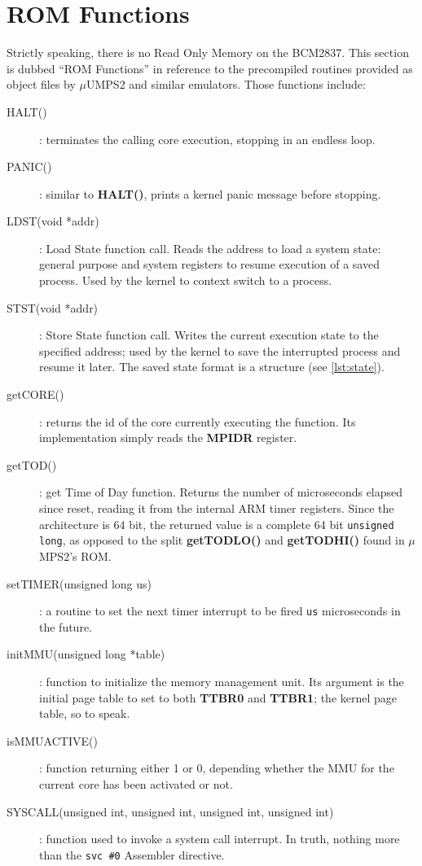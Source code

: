 \documentclass[12pt,a4paper,openright,twoside]{report}
\begin{document}
\section{ROM Functions}
Strictly speaking, there is no Read Only Memory on the BCM2837. This section is 
dubbed ``ROM Functions'' in reference to the precompiled routines provided as 
object files by $\mu$UMPS2 and similar emulators.
Those functions include:
\begin{description}
    \item[HALT()]: terminates the calling core execution, stopping in an endless loop.
    \item[PANIC()]: similar to \textbf{HALT()}, prints a kernel panic message before
        stopping.
    \item[LDST(void *addr)]: Load State function call. Reads the address to load
        a system state: general purpose and system registers to resume execution
        of a saved process. Used by the kernel to context switch to a process.
    \item[STST(void *addr)]: Store State function call. Writes the current execution
        state to the specified address; used by the kernel to save the interrupted
        process and resume it later. The saved state format is a structure (see
         \ref{lst:state}).
    \item[getCORE()]: returns the id of the core currently executing the function.
        Its implementation simply reads the \textbf{MPIDR} register.
    \item[getTOD()]: get Time of Day function. Returns the number of microseconds
        elapsed since reset, reading it from the internal ARM
        timer registers. Since the architecture is 64 bit, the returned value 
        is a complete 64 bit {\tt unsigned long}, as opposed to the split 
        \textbf{getTODLO()} and \textbf{getTODHI()} found in $\mu$MPS2's ROM.
    \item[setTIMER(unsigned long us)]: a routine to set the next timer interrupt to 
        be fired {\tt us} microseconds in the future.
    \item[initMMU(unsigned long *table)]: function to initialize the memory 
        management unit. Its argument is the initial page table to set to both
        \textbf{TTBR0} and \textbf{TTBR1}; the kernel page table, so to speak.
    \item[isMMUACTIVE()]: function returning either 1 or 0, depending whether
        the MMU for the current core has been activated or not.
    \item[SYSCALL(unsigned int, unsigned int, unsigned int, unsigned int)]:
    function used to invoke a system call interrupt. In truth, nothing more than
    the {\tt svc \#0} Assembler directive.
\end{description}
\end{document}
